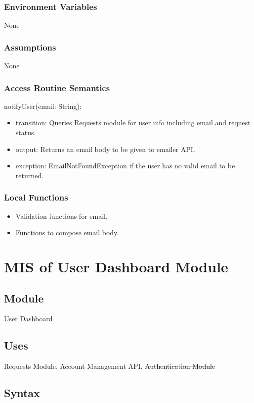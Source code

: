 \documentclass[12pt, titlepage]{article}
\begin{document}
\subsubsection{Environment Variables}
None

\subsubsection{Assumptions}
None

\subsubsection{Access Routine Semantics}

\noindent notifyUser(email: String):
\begin{itemize}
  \item transition: Queries Requests module for user info including email and request status.
  \item output: Returns an email body to be given to emailer API.
  \item exception: EmailNotFoundException if the user has no valid email to be returned.
\end{itemize}

\subsubsection{Local Functions}
\begin{itemize}
  \item Validation functions for email.
  \item Functions to compose email body.
\end{itemize}

\section{MIS of User Dashboard Module} \label{UserDashboard} \subsection{Module} User Dashboard

\subsection{Uses}
Requests Module, Account Management API, \st{Authentication Module}

\subsection{Syntax}
\end{document}
